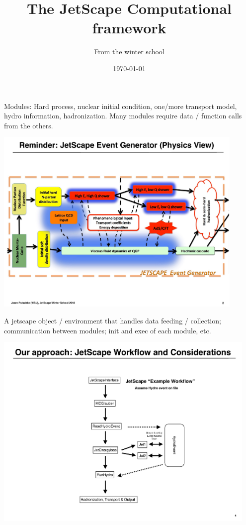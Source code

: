 \documentclass[11pt]{beamer}
\author{From the winter school}
\title{The JetScape Computational framework}
\date{\today}
\begin{document}
\begin{frame}
\titlepage
\end{frame}


\begin{frame}
\begin{overprint}
 Modules: Hard process, nuclear initial condition, one/more transport model, hydro information, hadronization.
 Many modules require data / function calls from the others.
\end{overprint}
\begin{center}
\includegraphics[width=0.9\textwidth]{./talks/p3.pdf}
\end{center}
\end{frame}

\begin{frame}
A jetscape object / environment that handles data feeding / collection; communication between modules; init and exec of each module, etc.
\begin{center}
\includegraphics[width=0.95\textwidth]{./talks/p5.pdf}
\end{center}
\end{frame}
\end{document}
